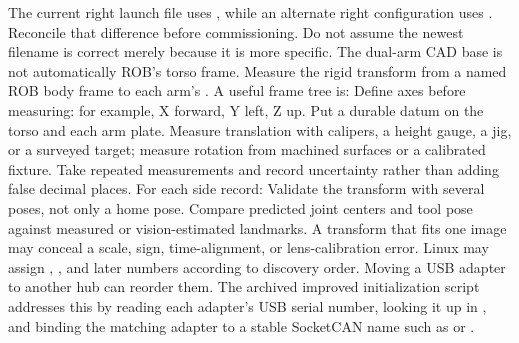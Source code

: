 {}The current right launch file uses , while an alternate right configuration uses . Reconcile that difference before commissioning. Do not assume the newest filename is correct merely because it is more specific.\markdownRendererInterblockSeparator
{}
\markdownRendererSectionEnd 
\markdownRendererSectionEnd \markdownRendererSectionBegin
{}\markdownRendererInterblockSeparator
{}The dual-arm CAD base is not automatically ROB's torso frame. Measure the rigid transform from a named ROB body frame to each arm's . A useful frame tree is:\markdownRendererInterblockSeparator
{}\markdownRendererInterblockSeparator
{}Define axes before measuring: for example, X forward, Y left, Z up. Put a durable datum on the torso and each arm plate. Measure translation with calipers, a height gauge, a jig, or a surveyed target; measure rotation from machined surfaces or a calibrated fixture. Take repeated measurements and record uncertainty rather than adding false decimal places.\markdownRendererInterblockSeparator
{}\markdownRendererSectionBegin
{}\markdownRendererInterblockSeparator
{}For each side record:\markdownRendererInterblockSeparator
{}\markdownRendererInterblockSeparator
{}Validate the transform with several poses, not only a home pose. Compare predicted joint centers and tool pose against measured or vision-estimated landmarks. A transform that fits one image may conceal a scale, sign, time-alignment, or lens-calibration error.\markdownRendererInterblockSeparator
{}
\markdownRendererSectionEnd 
\markdownRendererSectionEnd \markdownRendererSectionBegin
{}\markdownRendererInterblockSeparator
{}Linux may assign , , and later numbers according to discovery order. Moving a USB adapter to another hub can reorder them. The archived improved initialization script addresses this by reading each adapter's USB serial number, looking it up in , and binding the matching adapter to a stable SocketCAN name such as  or .\markdownRendererParagraphSeparator
